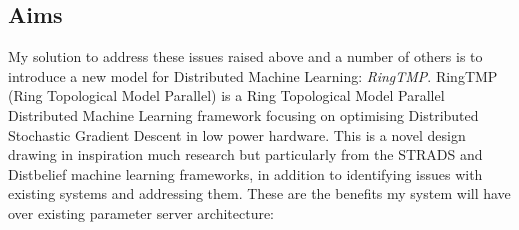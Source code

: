 \subsection{Aims}
My solution to address these issues raised above and a number of others is to
introduce a new model for Distributed Machine Learning: \textit{RingTMP}.
RingTMP (Ring Topological Model Parallel) is a Ring Topological Model Parallel
Distributed Machine Learning framework focusing on optimising Distributed
Stochastic Gradient Descent in low power hardware. This is a novel design
drawing in inspiration much research but particularly from the STRADS and
Distbelief machine learning frameworks, \cite{kim2016STRADS,Dean2012Distbelief}
in addition to identifying issues with existing systems and addressing them.
These are the benefits my system will have over existing parameter server
architecture:
